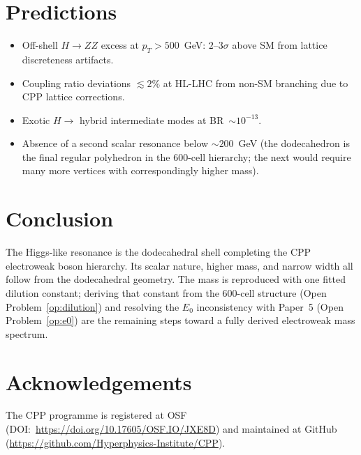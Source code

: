 \documentclass[11pt,letterpaper]{article}
\begin{document}
\section{Predictions}

\begin{itemize}
\item Off-shell $H\to ZZ$ excess at $p_T > 500$~GeV:
  $2$--$3\sigma$ above SM from lattice discreteness artifacts.
\item Coupling ratio deviations $\lesssim 2\%$ at HL-LHC from
  non-SM branching due to CPP lattice corrections.
\item Exotic $H\to$ hybrid intermediate modes at BR~$\sim10^{-13}$.
\item Absence of a second scalar resonance below $\sim200$~GeV
  (the dodecahedron is the final regular polyhedron in the 600-cell
  hierarchy; the next would require many more vertices with
  correspondingly higher mass).
\end{itemize}

\section{Conclusion}

The Higgs-like resonance is the dodecahedral shell completing the
CPP electroweak boson hierarchy.  Its scalar nature, higher mass, and
narrow width all follow from the dodecahedral geometry.  The mass is
reproduced with one fitted dilution constant; deriving that constant
from the 600-cell structure (Open Problem~\ref{op:dilution}) and
resolving the $E_0$ inconsistency with Paper~5 (Open
Problem~\ref{op:e0}) are the remaining steps toward a fully derived
electroweak mass spectrum.





\section*{Acknowledgements}
The CPP programme is registered at OSF (DOI:~\url{https://doi.org/10.17605/OSF.IO/JXE8D}) and maintained at GitHub (\url{https://github.com/Hyperphysics-Institute/CPP}).
\end{document}
